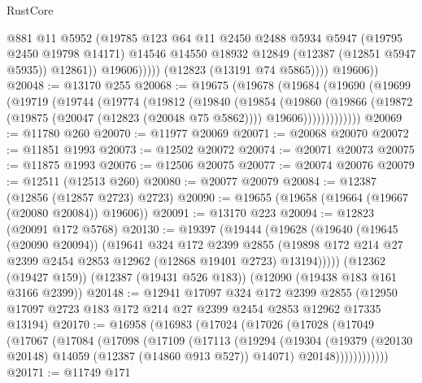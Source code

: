 \begin{lexlean}{RustCore}
\begin{coremodule}
                        @881
                        @11
                        @5952
                        (@19785
                          @123
                          @64
                          @11
                          @2450
                          @2488
                          @5934
                          @5947
                          (@19795 @2450 @19798 @14171)
                          @14546
                          @14550
                          @18932
                          @12849
                          (@12387 (@12851 @5947 @5935))
                          @12861))
                      @19606)))))
            (@12823 (@13191 @74 @5865))))
        @19606))
@20048 := @13170 @255
@20068 := @19675
    (@19678
      (@19684
        (@19690
          (@19699
            (@19719
              (@19744
                (@19774
                  (@19812
                    (@19840
                      (@19854
                        (@19860
                          (@19866
                            (@19872
                              (@19875 (@20047 (@12823 (@20048 @75 @5862))))
                              @19606)))))))))))))
@20069 := @11780 @260
@20070 := @11977 @20069
@20071 := @20068 @20070
@20072 := @11851 @1993
@20073 := @12502 @20072
@20074 := @20071 @20073
@20075 := @11875 @1993
@20076 := @12506 @20075
@20077 := @20074 @20076
@20079 := @12511 (@12513 @260)
@20080 := @20077 @20079
@20084 := @12387 (@12856 (@12857 @2723) @2723)
@20090 := @19655 (@19658 (@19664 (@19667 (@20080 @20084)) @19606))
@20091 := @13170 @223
@20094 := @12823 (@20091 @172 @5768)
@20130 := @19397
    (@19444
      (@19628
        (@19640
          (@19645 (@20090 @20094))
          (@19641
            @324
            @172
            @2399
            @2855
            (@19898 @172 @214 @27 @2399 @2454 @2853 @12962 (@12868 @19401 @2723) @13194)))))
    (@12362 (@19427 @159))
    (@12387 (@19431 @526 @183))
    (@12090 (@19438 @183 @161 @3166 @2399))
@20148 := @12941
    @17097
    @324
    @172
    @2399
    @2855
    (@12950 @17097 @2723 @183 @172 @214 @27 @2399 @2454 @2853 @12962 @17335 @13194)
@20170 := @16958
    (@16983
      (@17024
        (@17026
          (@17028
            (@17049
              (@17067
                (@17084
                  (@17098
                    (@17109
                      (@17113
                        (@19294
                          (@19304
                            (@19379 (@20130 @20148) @14059 (@12387 (@14860 @913 @527)) @14071)
                            @20148))))))))))))
@20171 := @11749 @171

\end{coremodule}
\end{lexlean}
